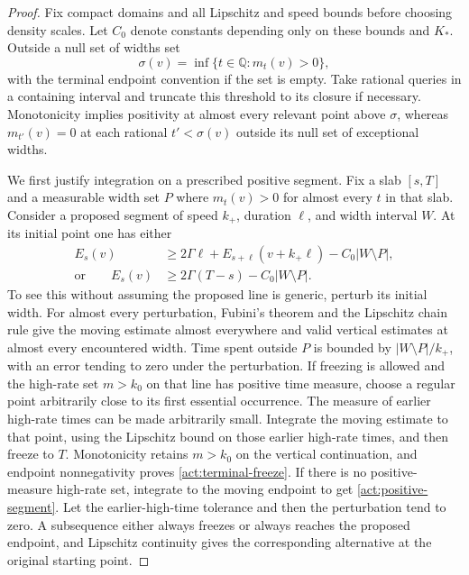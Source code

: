 \begin{proof}
Fix compact domains and all Lipschitz and speed bounds before
choosing density scales.  Let $C_0$ denote constants depending
only on these bounds and $K_*$.  Outside a null set of widths set
\[
 \sigma(v)=\inf\{t\in\mathbb Q:m_t(v)>0\},
\]
with the terminal endpoint convention if the set is empty.
Take rational queries in a containing interval and truncate this
threshold to its closure if necessary.  Monotonicity implies
positivity at almost every relevant point above $\sigma$, whereas
$m_{t'}(v)=0$ at each rational $t'<\sigma(v)$ outside its null
set of exceptional widths.

We first justify integration on a prescribed positive segment.
Fix a slab $[s,T]$ and a measurable width set $P$ where $m_t(v)>0$
for almost every $t$ in that slab.  Consider a proposed segment
of speed $k_+$, duration $\ell$, and width interval $W$.
At its initial point one has either
\begin{align}
 E_s(v)&\ge2\Gamma\ell+E_{s+\ell}(v+k_+\ell)
                  -C_0|W\setminus P|,
                  \label{act:positive-segment}\\
 \text{or}\qquad
 E_s(v)&\ge2\Gamma(T-s)-C_0|W\setminus P|.
                  \label{act:terminal-freeze}
\end{align}
To see this without assuming the proposed line is generic, perturb
its initial width.  For almost every perturbation, Fubini's theorem
and the Lipschitz chain rule give the moving estimate almost
everywhere and valid vertical estimates at almost every encountered
width.  Time spent outside $P$ is bounded by
$|W\setminus P|/k_+$, with an error tending to zero under the
perturbation.  If freezing is allowed and the high-rate set
$m>k_0$ on that line has positive time measure, choose a regular
point arbitrarily close to its first essential occurrence.
The measure of earlier high-rate times can be made arbitrarily
small.  Integrate the moving estimate to that point, using the
Lipschitz bound on those earlier high-rate times, and then freeze
to $T$.  Monotonicity retains $m>k_0$ on the vertical continuation,
and endpoint nonnegativity proves \eqref{act:terminal-freeze}.
If there is no positive-measure high-rate set, integrate to the
moving endpoint to get \eqref{act:positive-segment}.
Let the earlier-high-time tolerance and then the perturbation
tend to zero.  A subsequence either always freezes or always
reaches the proposed endpoint, and Lipschitz continuity gives the
corresponding alternative at the original starting point.


\end{proof}
